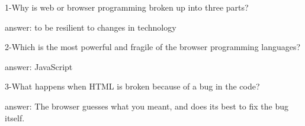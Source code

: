 1-Why is web or browser programming broken up into three parts?

answer: to be resilient to changes in technology

2-Which is the most powerful and fragile of the browser programming languages?

answer: JavaScript

3-What happens when HTML is broken because of a bug in the code?

answer: The browser guesses what you meant, and does its best to fix the bug itself.
